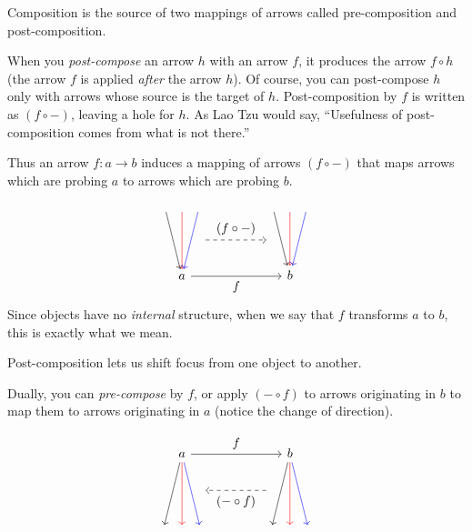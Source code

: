 \documentclass[DaoFP]{subfiles}
\begin{document}
Composition is the source of two mappings of arrows called pre-composition and post-composition. 

When you \emph{post-compose} an arrow $h$ with an arrow $f$, it produces the arrow $f \circ h$ (the arrow $f$ is applied \emph{after} the arrow $h$). Of course, you can post-compose $h$ only with arrows whose source is the target of $h$. Post-composition by $f$ is written as $(f \circ -)$, leaving a hole for $h$. As Lao Tzu would say, ``Usefulness of post-composition comes from what is not there.''

Thus an arrow $f \colon a \to b$ induces a mapping of arrows $(f \circ -)$ that maps arrows which are probing $a$ to arrows which are probing $b$. 

\[
 \begin{tikzcd}
 \node (a1) at (0, 2) {};
 \node (a2) at (-0.5, 2) {};
 \node (a3) at (0.5, 2) {};
 \node (aa) at (0.5, 1) {};
 \node(a) at (0, 0) {a};
 \draw[->, red] (a1) -- (a);
 \draw[->] (a2) -- (a);
 \draw[->, blue] (a3) -- (a);
 \node (b1) at (3+0, 2) {};
 \node (b2) at (3-0.5, 2) {};
 \node (b3) at (3+0.5, 2) {};
 \node (bb) at (2.5, 1) {};
 \node(b) at (3, 0) {b};
 \draw[->, red] (b1) -- (b);
 \draw[->] (b2) -- (b);
 \draw[->, blue] (b3) -- (b);
 \draw[->] (a) -- node[below]{f} (b);
 \draw[->, dashed] (aa) -- node[above]{(f \circ -)} (bb);
  \end{tikzcd}
\]
Since objects have no \emph{internal} structure, when we say that $f$ transforms $a$ to $b$, this is exactly what we mean. 

Post-composition lets us shift focus from one object to another.

Dually, you can \emph{pre-compose} by $f$, or apply $(- \circ f)$ to arrows originating in $b$ to map them to arrows originating in $a$ (notice the change of direction). 

\[
 \begin{tikzcd}
 \node (a1) at (0, -2) {};
 \node (a2) at (-0.5, -2) {};
 \node (a3) at (0.5, -2) {};
 \node (aa) at (0.5, -1) {};
 \node(a) at (0, 0) {a};
 \draw[<-, red] (a1) -- (a);
 \draw[<-] (a2) -- (a);
 \draw[<-, blue] (a3) -- (a);
 \node (b1) at (3+0, -2) {};
 \node (b2) at (3-0.5, -2) {};
 \node (b3) at (3+0.5, -2) {};
 \node (bb) at (2.5, -1) {};
 \node(b) at (3, 0) {b};
 \draw[<-, red] (b1) -- (b);
 \draw[<-] (b2) -- (b);
 \draw[<-, blue] (b3) -- (b);
 \draw[->] (a) -- node[above]{f} (b);
 \draw[->, dashed] (bb) -- node[below]{(- \circ f)} (aa);
  \end{tikzcd}
\]
\end{document}
